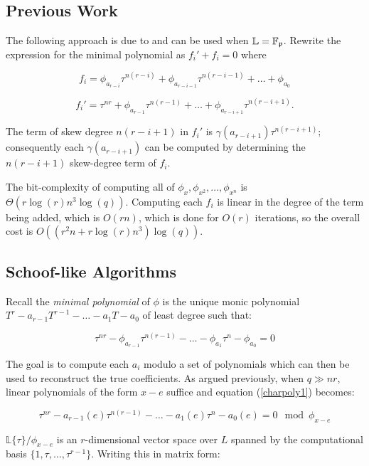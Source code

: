\documentclass[sigconf]{acmart}
\newcommand{\F}{\mathbb{F}}
\renewcommand{\L}{\mathbb{L}}
\begin{document}
\subsection{Previous Work}

The following approach is due to \cite{GaraiPapikian} and can be used when $\L = \F_{\frak{p}}$. Rewrite the expression for the minimal polynomial as $f_i' + f_i = 0$ where

\[ f_i = \phi_{a_{r-i}}\tau^{n (r-i)} + \phi_{a_{r - i -1 }}\tau^{n (r-i-1)} + \ldots + \phi_{a_0} \]

\[ f_i' = \tau^{nr} + \phi_{a_{r -1 }}\tau^{n (r-1)} + \ldots + \phi_{a_{r-i + 1}}\tau^{n(r - i + 1)}. \]

The term of skew degree $n(r - i + 1)$ in $f_i'$ is  $\gamma(a_{r-i+1}) \tau^{n(r-i + 1)}$; consequently each $\gamma(a_{r-i+1})$ can be computed by determining the $n(r - i + 1)$ skew-degree term of $f_i$.

The bit-complexity of computing all of $\phi_x, \phi_{x^2}, \ldots, \phi_{x^n}$ is \newline
$\Theta(r\log(r)n^3\log(q))$. Computing each $f_i$ is linear in the degree of the term being added, which is $O(rn)$, which is done for $O(r)$ iterations, so the overall cost is $O((r^2n + r\log(r)n^3)\log(q) )$.

\subsection{Schoof-like Algorithms}

Recall the \textit{minimal polynomial} of $\phi$ is the unique monic polynomial $T^r - a_{r-1}T^{r-1} - \ldots - a_1T - a_0$ of least degree such that:

\begin{equation} \label{charpoly1}
 \tau^{nr} - \phi_{a_{r-1}}\tau^{n(r-1)} - \ldots - \phi_{a_1} \tau^n - \phi_{a_0} = 0
\end{equation}


The goal is to compute each $a_i$ modulo a set of polynomials which can then be used to reconstruct the true coefficients. As argued previously, when $q \gg nr$, linear polynomials of the form $x - e$ suffice and equation (\ref{charpoly1}) becomes:

\begin{equation}
\tau^{nr} - a_{r-1}(e)\tau^{n(r-1)} - \ldots - a_1(e)\tau^n - a_0(e)  = 0 \mod \phi_{x - e}
\end{equation}

$\L\{\tau \}/\phi_{x-e}$ is an $r$-dimensional vector space over $L$ spanned by the computational basis $\{1, \tau, \ldots, \tau^{r-1}\}$. Writing this in matrix form:
\end{document}
